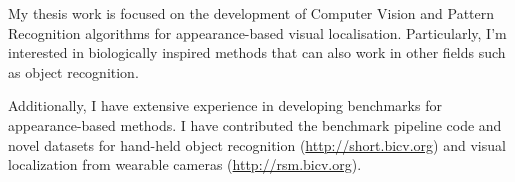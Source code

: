 My thesis work is focused on the development of Computer Vision and Pattern Recognition algorithms for appearance-based visual localisation. Particularly, I'm interested in biologically inspired methods that can also work in other fields such as object recognition.

Additionally, I have extensive experience in developing benchmarks for appearance-based methods. I have contributed the benchmark pipeline code and novel datasets for hand-held object recognition (\url{http://short.bicv.org}) and visual localization from wearable cameras (\url{http://rsm.bicv.org}).

